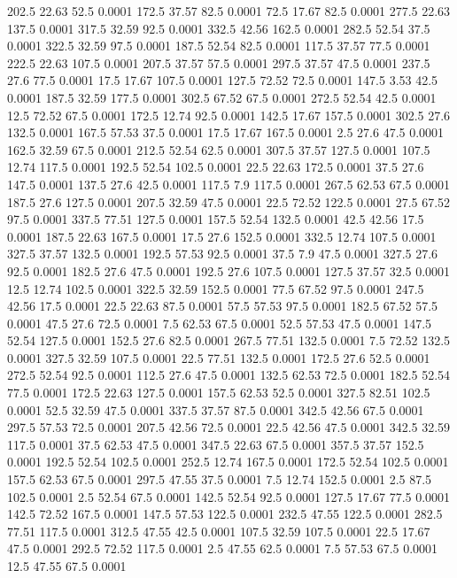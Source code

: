 202.5	22.63	52.5	0.0001
172.5	37.57	82.5	0.0001
72.5	17.67	82.5	0.0001
277.5	22.63	137.5	0.0001
317.5	32.59	92.5	0.0001
332.5	42.56	162.5	0.0001
282.5	52.54	37.5	0.0001
322.5	32.59	97.5	0.0001
187.5	52.54	82.5	0.0001
117.5	37.57	77.5	0.0001
222.5	22.63	107.5	0.0001
207.5	37.57	57.5	0.0001
297.5	37.57	47.5	0.0001
237.5	27.6	77.5	0.0001
17.5	17.67	107.5	0.0001
127.5	72.52	72.5	0.0001
147.5	3.53	42.5	0.0001
187.5	32.59	177.5	0.0001
302.5	67.52	67.5	0.0001
272.5	52.54	42.5	0.0001
12.5	72.52	67.5	0.0001
172.5	12.74	92.5	0.0001
142.5	17.67	157.5	0.0001
302.5	27.6	132.5	0.0001
167.5	57.53	37.5	0.0001
17.5	17.67	167.5	0.0001
2.5	27.6	47.5	0.0001
162.5	32.59	67.5	0.0001
212.5	52.54	62.5	0.0001
307.5	37.57	127.5	0.0001
107.5	12.74	117.5	0.0001
192.5	52.54	102.5	0.0001
22.5	22.63	172.5	0.0001
37.5	27.6	147.5	0.0001
137.5	27.6	42.5	0.0001
117.5	7.9	117.5	0.0001
267.5	62.53	67.5	0.0001
187.5	27.6	127.5	0.0001
207.5	32.59	47.5	0.0001
22.5	72.52	122.5	0.0001
27.5	67.52	97.5	0.0001
337.5	77.51	127.5	0.0001
157.5	52.54	132.5	0.0001
42.5	42.56	17.5	0.0001
187.5	22.63	167.5	0.0001
17.5	27.6	152.5	0.0001
332.5	12.74	107.5	0.0001
327.5	37.57	132.5	0.0001
192.5	57.53	92.5	0.0001
37.5	7.9	47.5	0.0001
327.5	27.6	92.5	0.0001
182.5	27.6	47.5	0.0001
192.5	27.6	107.5	0.0001
127.5	37.57	32.5	0.0001
12.5	12.74	102.5	0.0001
322.5	32.59	152.5	0.0001
77.5	67.52	97.5	0.0001
247.5	42.56	17.5	0.0001
22.5	22.63	87.5	0.0001
57.5	57.53	97.5	0.0001
182.5	67.52	57.5	0.0001
47.5	27.6	72.5	0.0001
7.5	62.53	67.5	0.0001
52.5	57.53	47.5	0.0001
147.5	52.54	127.5	0.0001
152.5	27.6	82.5	0.0001
267.5	77.51	132.5	0.0001
7.5	72.52	132.5	0.0001
327.5	32.59	107.5	0.0001
22.5	77.51	132.5	0.0001
172.5	27.6	52.5	0.0001
272.5	52.54	92.5	0.0001
112.5	27.6	47.5	0.0001
132.5	62.53	72.5	0.0001
182.5	52.54	77.5	0.0001
172.5	22.63	127.5	0.0001
157.5	62.53	52.5	0.0001
327.5	82.51	102.5	0.0001
52.5	32.59	47.5	0.0001
337.5	37.57	87.5	0.0001
342.5	42.56	67.5	0.0001
297.5	57.53	72.5	0.0001
207.5	42.56	72.5	0.0001
22.5	42.56	47.5	0.0001
342.5	32.59	117.5	0.0001
37.5	62.53	47.5	0.0001
347.5	22.63	67.5	0.0001
357.5	37.57	152.5	0.0001
192.5	52.54	102.5	0.0001
252.5	12.74	167.5	0.0001
172.5	52.54	102.5	0.0001
157.5	62.53	67.5	0.0001
297.5	47.55	37.5	0.0001
7.5	12.74	152.5	0.0001
2.5	87.5	102.5	0.0001
2.5	52.54	67.5	0.0001
142.5	52.54	92.5	0.0001
127.5	17.67	77.5	0.0001
142.5	72.52	167.5	0.0001
147.5	57.53	122.5	0.0001
232.5	47.55	122.5	0.0001
282.5	77.51	117.5	0.0001
312.5	47.55	42.5	0.0001
107.5	32.59	107.5	0.0001
22.5	17.67	47.5	0.0001
292.5	72.52	117.5	0.0001
2.5	47.55	62.5	0.0001
7.5	57.53	67.5	0.0001
12.5	47.55	67.5	0.0001
